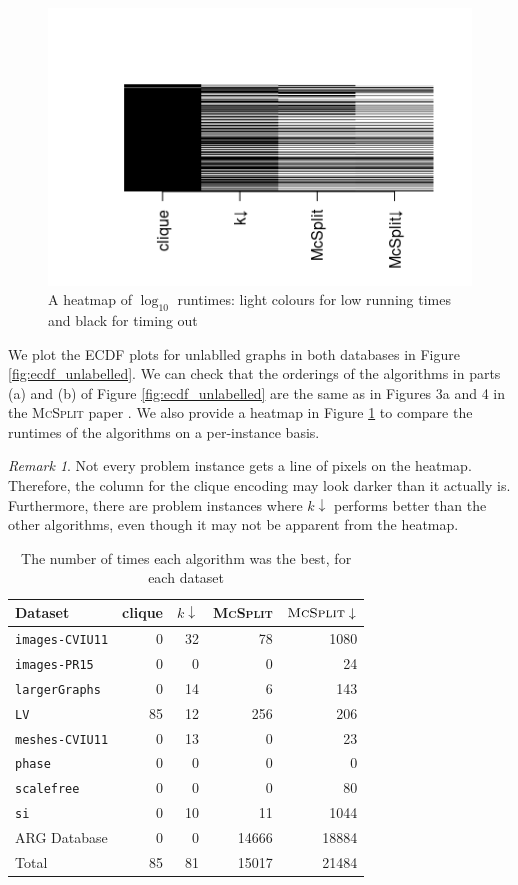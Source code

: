 \documentclass{l4proj}
\theoremstyle{definition}
\theoremstyle{remark}
\newtheorem{remark}{Remark}[section]
\begin{document}
\begin{figure}
  \centering
  \includegraphics{images/runtime_heatmap.png}
  \caption{A heatmap of $\log_{10}$ runtimes: light colours for low running
    times and black for timing out}
  \label{fig:runtime_heatmap}
\end{figure}

We plot the ECDF plots for unlablled graphs in both databases in Figure
\ref{fig:ecdf_unlabelled}. We can check that the orderings of the algorithms in
parts (a) and (b) of Figure \ref{fig:ecdf_unlabelled} are the same as in Figures
3a and 4 in the \textsc{McSplit} paper \cite{DBLP:conf/ijcai/McCreeshPT17}. We
also provide a heatmap in Figure \ref{fig:runtime_heatmap} to compare the
runtimes of the algorithms on a per-instance basis.

\begin{remark}
  Not every problem instance gets a line of pixels on the heatmap. Therefore,
  the column for the clique encoding may look darker than it actually is.
  Furthermore, there are problem instances where $k\downarrow$ performs better
  than the other algorithms, even though it may not be apparent from the heatmap.
\end{remark}

\begin{table}
  \centering
  \begin{tabular}{l r r r r}
    Dataset & clique & $k\downarrow$ & \textsc{McSplit} & $\textsc{McSplit}\downarrow$ \\
    \hline
    \texttt{images-CVIU11} & 0 & 32 & 78 & 1080 \\
    \texttt{images-PR15} & 0 & 0 & 0 & 24 \\
    \texttt{largerGraphs} & 0 & 14 & 6 & 143 \\
    \texttt{LV} & 85 & 12 & 256 & 206 \\
    \texttt{meshes-CVIU11} & 0 & 13 & 0 & 23 \\
    \texttt{phase} & 0 & 0 & 0 & 0 \\
    \texttt{scalefree} & 0 & 0 & 0 & 80 \\
    \texttt{si} & 0 & 10 & 11 & 1044 \\
    ARG Database & 0 & 0 & 14666 & 18884 \\
    \hline
    Total & 85 & 81 & 15017 & 21484
  \end{tabular}
  \caption{The number of times each algorithm was the best, for each dataset}
  \label{table:best}
\end{table}
\end{document}
